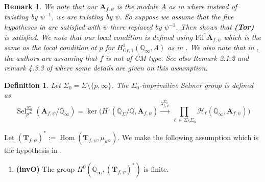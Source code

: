 \documentclass{amsart}
\newcommand{\Fil}{\mathrm{Fil}}
\newcommand{\Q}{\mathbb{Q}}
\newcommand{\bT}{\mathbf{T}}
\newcommand{\bA}{\mathbf{A}}
\newcommand{\Hom}{\operatorname{Hom}}
\newcommand{\Sel}{\operatorname{Sel}}
\newtheorem{auxiliary proposition}[theorem]{Auxiliary Proposition}
\newtheorem{definition}[theorem]{Definition}
\newtheorem{main conjecture}[theorem]{Main Conjecture}
\newtheorem{main theorem}[theorem]{Main Theorem}
\newtheorem{modesty proposition}[theorem]{Modesty Proposition}
\newtheorem{open problem}[theorem]{Open Problem}
\newtheorem{remark}[theorem]{Remark}
\newtheorem{convergence lemma}[theorem]{Convergence Lemma}
\newtheorem{corrected lemma}[theorem]{Corrected Lemma}
\newtheorem{growth lemma}[theorem]{Growth Lemma}
\newtheorem{coefficient lemma}[theorem]{Integrality Lemma}
\newtheorem{interpolation lemma}[theorem]{Interpolation Lemma}
\newtheorem{kernel lemma}[theorem]{Kernel Lemma}
\newtheorem{limit lemma}[theorem]{Limit Lemma}
\newtheorem{tandem lemma}[theorem]{Modesty Lemma}
\newtheorem{zero-finding lemma}[theorem]{Zero-Finding Lemma}
\begin{document}
\begin{remark}\label{rem:tor}
    We note that our $\bA_{f,\psi}$ is the module $A$ as in \cite[Notation 3.2.4]{LZ16} where instead of twisting by $\psi^{-1}$, we are twisting by $\psi$. So suppose  we assume that the five hypotheses in \cite[Section 5.1]{LZ16} are satisfied with $\psi$ there replaced by $\psi^{-1}$. Then \cite[Theorem 5.4.2, second bullet point]{LZ16} shows that \textbf{(Tor)} is satisfied.  We note that our local condition is defined using $\Fil^1 \bA_{f, \psi}$ which is the same as the local condition at $p$ for $H^1_{\mathrm{Gr},1}(\Q_\infty,A)$ as in \cite[Proposition 3.4.4 (i)]{LZ16}. We also note that in \cite{LZ16}, the authors are assuming that $f$ is not of CM type. See also Remark 2.1.2 and remark 4.3.3 of \cite{LZ16} where some details are given on this assumption.
\end{remark}
\begin{definition} \label{def:imprimitive}
    Let $\Sigma_0=\Sigma \setminus \{p, \infty\}$. The $\Sigma_0$-imprimitive Selmer group  is defined as 
    $$\Sel_{p^\infty}^{\Sigma_0}(\bA_{f,\psi}/\Q_\infty)=\ker \Big(H^1(\Q_{\Sigma}/\Q,\bA_{f, \psi}) \xrightarrow{\lambda_{f, \psi}^{\Sigma_0}} \prod_{\ell \in \Sigma\setminus \Sigma_0}\mathcal{H}_{\ell}(\Q_\infty, \bA_{f, \psi})\Big)$$
\end{definition}
Let $(\bT_{f,\psi})^*:=\Hom(\bT_{f,\psi},\mu_{p^\infty}).$
We make the following assumption which is the hypothesis in \cite[Corollary 2.3]{GreenbergVatsal}. 
\begin{enumerate}[~] 
    \item \textbf{(invO)} The group  $H^0(\Q_\infty,(\bT_{f,\psi})^*)$ is finite.
\end{enumerate}
\end{document}
